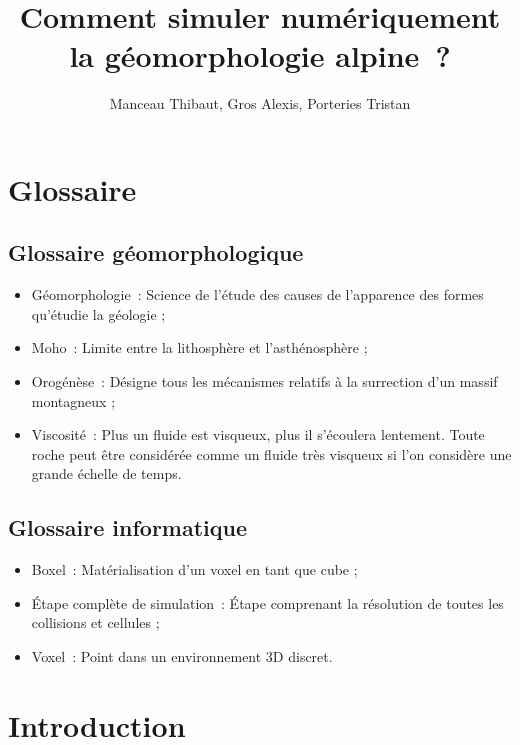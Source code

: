 \documentclass[a4paper,11pt]{article}
\title{Comment simuler numériquement la géomorphologie alpine~?}
\author{Manceau Thibaut, Gros Alexis, Porteries Tristan}
\begin{document}
\maketitle

\clearpage

\tableofcontents

\clearpage

\section{Glossaire}

\subsection{Glossaire géomorphologique}

\begin{itemize}
  \item Géomorphologie~: Science de l'étude des causes de l'apparence des formes qu'étudie la géologie ;
  \item Moho~: Limite entre la lithosphère et l'asthénosphère ;
  \item Orogénèse~: Désigne tous les mécanismes relatifs à la surrection d'un massif montagneux ;
  \item Viscosité~: Plus un fluide est visqueux, plus il s'écoulera lentement.
  Toute roche peut être considérée comme un fluide très visqueux si l'on considère une grande échelle de temps.
\end{itemize}

\subsection{Glossaire informatique}

\begin{itemize}
  \item Boxel~: Matérialisation d'un voxel en tant que cube ;
  \item Étape complète de simulation~: Étape comprenant la résolution de toutes les collisions et cellules ;
  \item Voxel~: Point dans un environnement 3D discret.
\end{itemize}

\section{Introduction}
\end{document}
